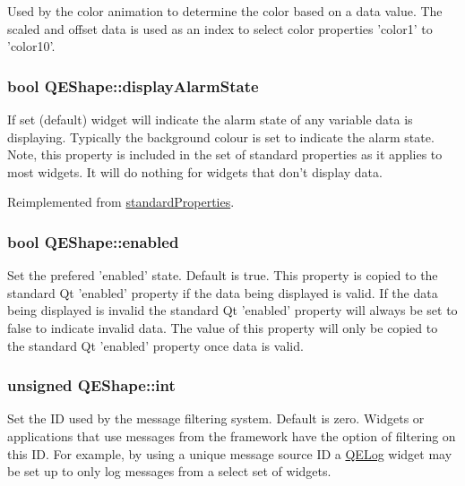 \label{classQEShape_ab12e5d604756ac4fa449f3569cc379f5}
Used by the color animation to determine the color based on a data value. The scaled and offset data is used as an index to select color properties 'color1' to 'color10'. \hypertarget{classQEShape_ae6bee1cb42a2467ad8f2b64a448d7436}{
\subsubsection[{displayAlarmState}]{\setlength{\rightskip}{0pt plus 5cm}bool QEShape::displayAlarmState}}
\label{classQEShape_ae6bee1cb42a2467ad8f2b64a448d7436}
If set (default) widget will indicate the alarm state of any variable data is displaying. Typically the background colour is set to indicate the alarm state. Note, this property is included in the set of standard properties as it applies to most widgets. It will do nothing for widgets that don't display data. 

Reimplemented from \hyperlink{classstandardProperties}{standardProperties}.

\hypertarget{classQEShape_a15eb8c61fc2f76a3c3118f26f5a29f5e}{
\subsubsection[{enabled}]{\setlength{\rightskip}{0pt plus 5cm}bool QEShape::enabled}}
\label{classQEShape_a15eb8c61fc2f76a3c3118f26f5a29f5e}
Set the prefered 'enabled' state. Default is true. This property is copied to the standard Qt 'enabled' property if the data being displayed is valid. If the data being displayed is invalid the standard Qt 'enabled' property will always be set to false to indicate invalid data. The value of this property will only be copied to the standard Qt 'enabled' property once data is valid. \hypertarget{classQEShape_abd83932e92ddc3be44eaa9e2409a6ea6}{
\subsubsection[{int}]{\setlength{\rightskip}{0pt plus 5cm}unsigned QEShape::int}}
\label{classQEShape_abd83932e92ddc3be44eaa9e2409a6ea6}
Set the ID used by the message filtering system. Default is zero. Widgets or applications that use messages from the framework have the option of filtering on this ID. For example, by using a unique message source ID a \hyperlink{classQELog}{QELog} widget may be set up to only log messages from a select set of widgets.

